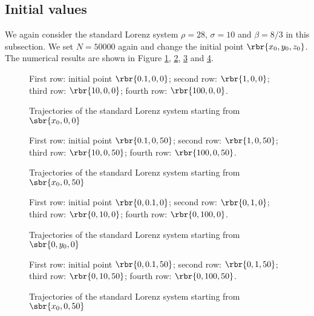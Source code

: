 \documentclass[english, nochinese]{pnote}
\begin{document}
\subsection{Initial values}

We again consider the standard Lorenz system $ \rho = 28 $, $ \sigma = 10 $ and $ \beta = 8 / 3 $ in this subsection. We set $ N = 50000 $ again and change the initial point $ \rbr{ x_0, y_0, z_0 } $. The numerical results are shown in Figure \ref{Fig:Init1}, \ref{Fig:Init2}, \ref{Fig:Init3} and \ref{Fig:Init4}.

\begin{figure}[htbp]
{
\centering
\scalebox{0.5}{}
\scalebox{0.5}{}
\scalebox{0.5}{}
\scalebox{0.5}{}
\caption{Trajectories of the standard Lorenz system starting from $ \sbr{ x_0, 0, 0 }$}
\label{Fig:Init1}
}
{
\footnotesize First row: initial point $ \rbr{ 0.1, 0, 0 } $; second row: $ \rbr{ 1, 0, 0 } $; third row: $ \rbr{ 10, 0, 0 } $; fourth row: $ \rbr{ 100, 0, 0 } $.
}
\end{figure}

\begin{figure}[htbp]
{
\centering
\scalebox{0.5}{}
\scalebox{0.5}{}
\scalebox{0.5}{}
\scalebox{0.5}{}
\caption{Trajectories of the standard Lorenz system starting from $ \sbr{ x_0, 0, 50 }$}
\label{Fig:Init2}
}
{
\footnotesize First row: initial point $ \rbr{ 0.1, 0, 50 } $; second row: $ \rbr{ 1, 0, 50 } $; third row: $ \rbr{ 10, 0, 50 } $; fourth row: $ \rbr{ 100, 0, 50 } $.
}
\end{figure}

\begin{figure}[htbp]
{
\centering
\scalebox{0.5}{}
\scalebox{0.5}{}
\scalebox{0.5}{}
\scalebox{0.5}{}
\caption{Trajectories of the standard Lorenz system starting from $ \sbr{ 0, y_0, 0 }$}
\label{Fig:Init3}
}
{
\footnotesize First row: initial point $ \rbr{ 0, 0.1, 0 } $; second row: $ \rbr{ 0, 1, 0 } $; third row: $ \rbr{ 0, 10, 0 } $; fourth row: $ \rbr{ 0, 100, 0 } $.
}
\end{figure}

\begin{figure}[htbp]
{
\centering
\scalebox{0.5}{}
\scalebox{0.5}{}
\scalebox{0.5}{}
\scalebox{0.5}{}
\caption{Trajectories of the standard Lorenz system starting from $ \sbr{ x_0, 0, 50 }$}
\label{Fig:Init4}
}
{
\footnotesize First row: initial point $ \rbr{ 0, 0.1, 50 } $; second row: $ \rbr{ 0, 1, 50 } $; third row: $ \rbr{ 0, 10, 50 } $; fourth row: $ \rbr{ 0, 100, 50 } $.
}
\end{figure}
\end{document}
